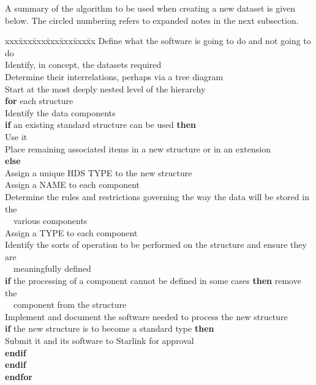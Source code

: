 A summary of the algorithm to be used when creating a new dataset is 
given below.  The circled numbering refers to expanded notes in the next 
subsection.
\begin{tabbing}
xxx\=xxx\=xxx\=xxx\=xxx\=xxx\=xx\kill
Define what the software is going to do and not going to do \\
Identify, in concept, the datasets required \\
Determine their interrelations, perhaps via a tree diagram \\
Start at the most deeply nested level of the hierarchy\\
{\bf for} each structure\+ \\
   Identify the data components\\
   {\bf if} an existing standard structure can be used {\bf then}\+ \\
      Use it \\
      Place remaining associated items in a new structure or in an extension\- \\
   {\bf else}\+ \\
      Assign a unique HDS TYPE to the new structure \\
      Assign a NAME to each component \\
      Determine the rules and restrictions governing the way the data will be stored in the\\
      ~~various components\\
      Assign a TYPE to each component \\
      Identify the sorts of operation to be performed on the structure and ensure they are\\
      ~~meaningfully defined \\
      {\bf if} the processing of a component cannot be defined in some cases {\bf then} remove the\\
      ~~component from the structure\\
      Implement and document the software needed to process the new structure \\
      {\bf if} the new structure is to become a standard type {\bf then}\+ \\
         Submit it and its software to Starlink for approval\- \\
      {\bf endif}\- \\
   {\bf endif}\- \\
{\bf endfor} \\
\end{tabbing}

